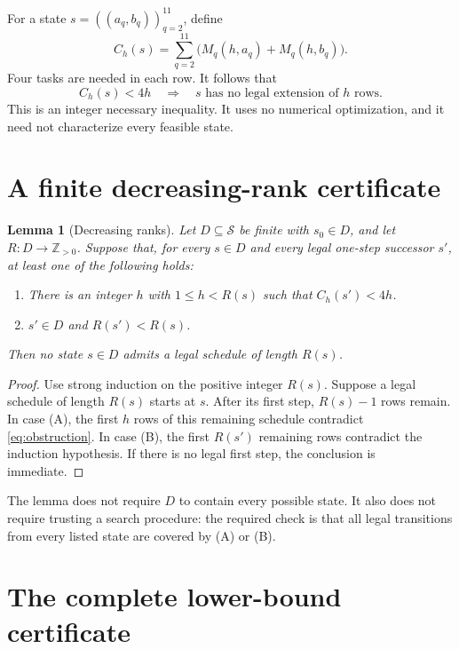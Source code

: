 \documentclass[11pt]{article}
\newtheorem{lemma}{Lemma}
\begin{document}
For a state $s=((a_q,b_q))_{q=2}^{11}$, define
\[
C_h(s)=\sum_{q=2}^{11}\bigl(M_q(h,a_q)+M_q(h,b_q)\bigr).
\]
Four tasks are needed in each row. It follows that
\begin{equation*}
C_h(s)<4h\quad\Longrightarrow\quad
s\text{ has no legal extension of $h$ rows}.
\tag{5}\label{eq:obstruction}
\end{equation*}
This is an integer necessary inequality. It uses no numerical
optimization, and it need not characterize every feasible state.

\section{A finite decreasing-rank certificate}

\begin{lemma}[Decreasing ranks]\label{lem:rank}
Let $D\subseteq\mathcal S$ be finite with $s_0\in D$, and let
$R:D\to\mathbb Z_{>0}$. Suppose that, for every $s\in D$ and
every legal one-step successor $s'$, at least one of the following
holds:
\begin{enumerate}
\item[(A)] There is an integer $h$ with $1\leq h<R(s)$ such that
$C_h(s')<4h$.
\item[(B)] $s'\in D$ and $R(s')<R(s)$.
\end{enumerate}
Then no state $s\in D$ admits a legal schedule of length $R(s)$.
\end{lemma}

\begin{proof}
Use strong induction on the positive integer $R(s)$. Suppose a
legal schedule of length $R(s)$ starts at $s$. After its first
step, $R(s)-1$ rows remain. In case (A), the first $h$ rows of this
remaining schedule contradict \eqref{eq:obstruction}. In case (B),
the first $R(s')$ remaining rows contradict the induction
hypothesis. If there is no legal first step, the conclusion is
immediate.
\end{proof}

The lemma does not require $D$ to contain every possible state.
It also does not require trusting a search procedure: the required
check is that all legal transitions from every listed state are
covered by (A) or (B).

\section{The complete lower-bound certificate}
\end{document}
